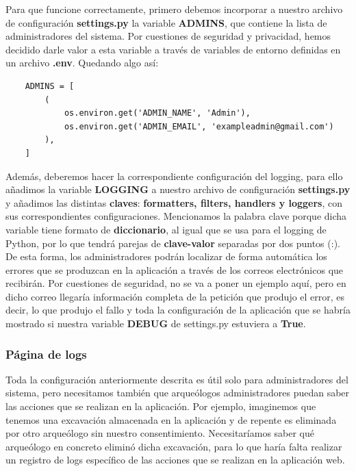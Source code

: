 Para que funcione correctamente, primero debemos incorporar a nuestro archivo de
configuración \textbf{settings.py} la variable \textbf{ADMINS}, que contiene la lista de
administradores del sistema. Por cuestiones de seguridad y privacidad, hemos decidido
darle valor a esta variable a través de variables de entorno definidas en un archivo
\textbf{.env}. Quedando algo así:

    
    \begin{verbatim}
    ADMINS = [
        (
            os.environ.get('ADMIN_NAME', 'Admin'),
            os.environ.get('ADMIN_EMAIL', 'exampleadmin@gmail.com')
        ),
    ]
    \end{verbatim}

Además, deberemos hacer la correspondiente configuración del logging, para ello añadimos
la variable \textbf{LOGGING} a nuestro archivo de configuración \textbf{settings.py} y
añadimos las distintas \textbf{claves}: \textbf{formatters, filters, handlers y loggers},
con sus correspondientes configuraciones. Mencionamos la palabra clave porque dicha
variable tiene formato de \textbf{diccionario}, al igual que se usa para el logging de
Python, por lo que tendrá parejas de \textbf{clave-valor} separadas por dos puntos (:). \\

De esta forma, los administradores podrán localizar de forma automática los errores
que se produzcan en la aplicación a través de los correos electrónicos que recibirán. Por
cuestiones de seguridad, no se va a poner un ejemplo aquí, pero en dicho correo llegaría
información completa de la petición que produjo el error, es decir, lo que produjo el
fallo y toda la configuración de la aplicación que se habría mostrado si nuestra variable
\textbf{DEBUG} de settings.py estuviera a \textbf{True}.


\subsubsection{Página de logs}
Toda la configuración anteriormente descrita es útil solo para administradores del sistema,
pero necesitamos también que arqueólogos administradores puedan saber las acciones que se
realizan en la aplicación. Por ejemplo, imaginemos que tenemos una excavación almacenada en
la aplicación y de repente es eliminada por otro arqueólogo sin nuestro consentimiento.
Necesitaríamos saber qué arqueólogo en concreto eliminó dicha excavación, para lo que haría
falta realizar un registro de logs específico de las acciones que se realizan en la
aplicación web. \\

